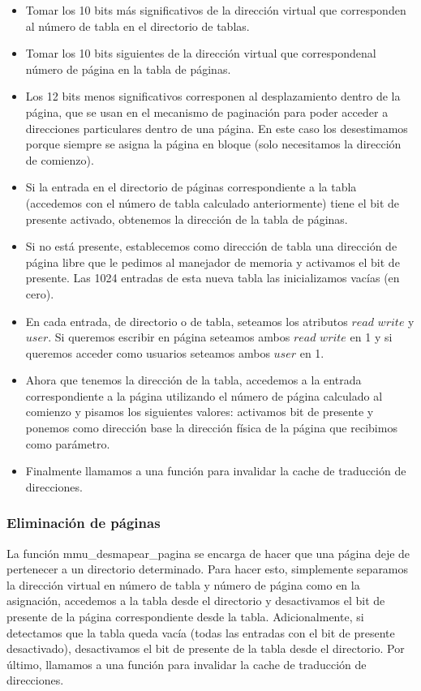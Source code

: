 \begin{itemize}
\item Tomar los 10 bits más significativos de la dirección virtual que corresponden al número de tabla en el directorio de tablas.
\item Tomar los 10 bits siguientes de la dirección virtual que correspondenal número de página en la tabla de páginas.
\item Los 12 bits menos significativos corresponen al desplazamiento dentro de la página, que se usan en el mecanismo de paginación para poder acceder a direcciones particulares dentro de una página. En este caso los desestimamos porque siempre se asigna la página en bloque (solo necesitamos la dirección de comienzo).
\item Si la entrada en el directorio de páginas correspondiente a la tabla (accedemos con el número de tabla calculado anteriormente) tiene el bit de presente activado, obtenemos la dirección de la tabla de páginas.
\item Si no está presente, establecemos como dirección de tabla una dirección de página libre que le pedimos al manejador de memoria y activamos el bit de presente. Las 1024 entradas de esta nueva tabla las inicializamos vacías (en cero).
\item En cada entrada, de directorio o de tabla, seteamos los atributos $read$ $write$ y $user$. Si queremos
escribir en página seteamos ambos $read$ $write$ en 1 y si queremos acceder como usuarios seteamos ambos
$user$ en 1.
\item Ahora que tenemos la dirección de la tabla, accedemos a la entrada correspondiente a la página utilizando el número de página calculado al comienzo y pisamos los siguientes valores: activamos bit de presente y ponemos como dirección base la dirección física de la página que recibimos como parámetro.
\item Finalmente llamamos a una función para invalidar la cache de traducción de direcciones.
\end{itemize}

\subsubsection{Eliminación de páginas}
La función mmu\_desmapear\_pagina se encarga de hacer que una página deje de pertenecer a un directorio determinado. Para hacer esto, simplemente separamos la dirección virtual en número de tabla y número de página como en la asignación, accedemos a la tabla desde el directorio y desactivamos el bit de presente de la página correspondiente desde la tabla. Adicionalmente, si detectamos que la tabla queda vacía (todas las entradas con el bit de presente desactivado), desactivamos el bit de presente de la tabla desde el directorio. Por último, llamamos a una función para invalidar la cache de traducción de direcciones.

